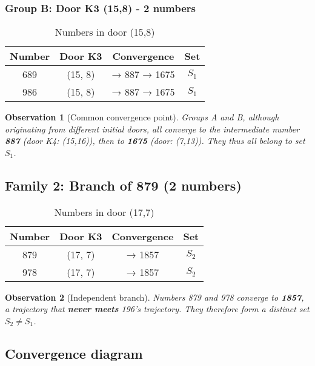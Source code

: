 \documentclass[12pt,a4paper]{article}
\newtheorem{observation}{Observation}[section]
\theoremstyle{remark}
\begin{document}
\subsubsection{Group B: Door K3 (15,8) - 2 numbers}

\begin{table}[h]
\centering
\caption{Numbers in door (15,8)}
\begin{tabular}{cccc}
\toprule
\textbf{Number} & \textbf{Door K3} & \textbf{Convergence} & \textbf{Set}\\
\midrule
689 & (15, 8) & → 887 → 1675 & $S_1$\\
986 & (15, 8) & → 887 → 1675 & $S_1$\\
\bottomrule
\end{tabular}
\end{table}

\begin{observation}[Common convergence point]
Groups A and B, although originating from different initial doors, all converge to the intermediate number \textbf{887} (door K4: (15,16)), then to \textbf{1675} (door: (7,13)). They thus all belong to set $S_1$.
\end{observation}

\subsection{Family 2: Branch of 879 (2 numbers)}

\begin{table}[h]
\centering
\caption{Numbers in door (17,7)}
\begin{tabular}{cccc}
\toprule
\textbf{Number} & \textbf{Door K3} & \textbf{Convergence} & \textbf{Set}\\
\midrule
879 & (17, 7) & → 1857 & $S_2$\\
978 & (17, 7) & → 1857 & $S_2$\\
\bottomrule
\end{tabular}
\end{table}

\begin{observation}[Independent branch]
Numbers 879 and 978 converge to \textbf{1857}, a trajectory that \textbf{never meets} 196's trajectory. They therefore form a distinct set $S_2 \neq S_1$.
\end{observation}

\subsection{Convergence diagram}
\end{document}
